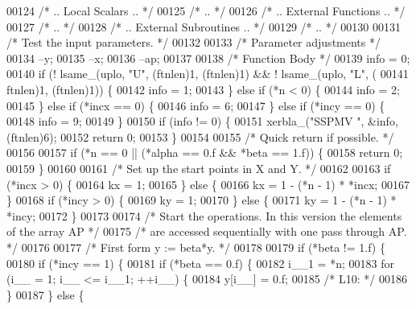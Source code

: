 \begin{DoxyCode}
00124 \textcolor{comment}{/*     .. Local Scalars .. */}
00125 \textcolor{comment}{/*     .. */}
00126 \textcolor{comment}{/*     .. External Functions .. */}
00127 \textcolor{comment}{/*     .. */}
00128 \textcolor{comment}{/*     .. External Subroutines .. */}
00129 \textcolor{comment}{/*     .. */}
00130 
00131 \textcolor{comment}{/*     Test the input parameters. */}
00132 
00133     \textcolor{comment}{/* Parameter adjustments */}
00134     --y;
00135     --x;
00136     --ap;
00137 
00138     \textcolor{comment}{/* Function Body */}
00139     info = 0;
00140     \textcolor{keywordflow}{if} (! lsame\_(uplo, \textcolor{stringliteral}{"U"}, (ftnlen)1, (ftnlen)1) && ! lsame\_(uplo, \textcolor{stringliteral}{"L"}, (
00141         ftnlen)1, (ftnlen)1)) \{
00142     info = 1;
00143     \} \textcolor{keywordflow}{else} \textcolor{keywordflow}{if} (*n < 0) \{
00144     info = 2;
00145     \} \textcolor{keywordflow}{else} \textcolor{keywordflow}{if} (*incx == 0) \{
00146     info = 6;
00147     \} \textcolor{keywordflow}{else} \textcolor{keywordflow}{if} (*incy == 0) \{
00148     info = 9;
00149     \}
00150     \textcolor{keywordflow}{if} (info != 0) \{
00151     xerbla\_(\textcolor{stringliteral}{"SSPMV "}, &info, (ftnlen)6);
00152     \textcolor{keywordflow}{return} 0;
00153     \}
00154 
00155 \textcolor{comment}{/*     Quick return if possible. */}
00156 
00157     \textcolor{keywordflow}{if} (*n == 0 || (*alpha == 0.f && *beta == 1.f)) \{
00158     \textcolor{keywordflow}{return} 0;
00159     \}
00160 
00161 \textcolor{comment}{/*     Set up the start points in  X  and  Y. */}
00162 
00163     \textcolor{keywordflow}{if} (*incx > 0) \{
00164     kx = 1;
00165     \} \textcolor{keywordflow}{else} \{
00166     kx = 1 - (*n - 1) * *incx;
00167     \}
00168     \textcolor{keywordflow}{if} (*incy > 0) \{
00169     ky = 1;
00170     \} \textcolor{keywordflow}{else} \{
00171     ky = 1 - (*n - 1) * *incy;
00172     \}
00173 
00174 \textcolor{comment}{/*     Start the operations. In this version the elements of the array AP */}
00175 \textcolor{comment}{/*     are accessed sequentially with one pass through AP. */}
00176 
00177 \textcolor{comment}{/*     First form  y := beta*y. */}
00178 
00179     \textcolor{keywordflow}{if} (*beta != 1.f) \{
00180     \textcolor{keywordflow}{if} (*incy == 1) \{
00181         \textcolor{keywordflow}{if} (*beta == 0.f) \{
00182         i\_\_1 = *n;
00183         \textcolor{keywordflow}{for} (i\_\_ = 1; i\_\_ <= i\_\_1; ++i\_\_) \{
00184             y[i\_\_] = 0.f;
00185 \textcolor{comment}{/* L10: */}
00186         \}
00187         \} \textcolor{keywordflow}{else} \{

\end{DoxyCode}
